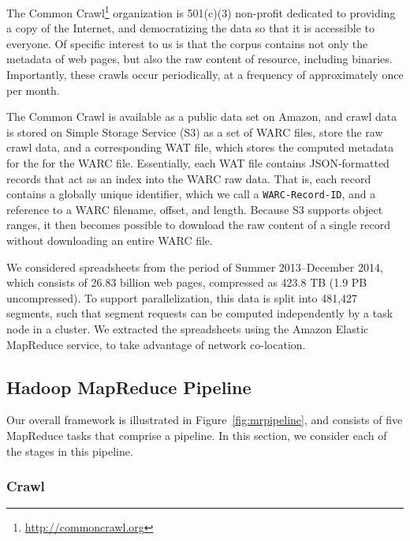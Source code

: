 \documentclass[conference]{IEEEtran}
\begin{document}

The Common Crawl\footnote{\url{http://commoncrawl.org}} organization is 501(c)(3) non-profit dedicated to providing a copy of the Internet, and democratizing the data so that it is accessible to everyone. 
%
Of specific interest to us is that the corpus contains not only the metadata of web pages, but also the raw content of resource, including binaries. Importantly, these crawls occur periodically, at a frequency of approximately once per month. 

The Common Crawl is available as a public data set on Amazon, and crawl data is stored on Simple Storage Service (S3) as a set of WARC files, store the raw crawl data, and a corresponding WAT file, which stores the computed metadata for the for the WARC file. Essentially, each WAT file contains JSON-formatted records that act as an index into the WARC raw data. That is, each record contains a globally unique identifier, which we call a \texttt{WARC-Record-ID}, and a reference to a WARC filename, offset, and length. Because S3 supports object ranges, it then becomes possible to download the raw content of a single record without downloading an entire WARC file.

We considered spreadsheets from the period of Summer 2013--December 2014, which consists of 26.83 billion web pages, compressed as 423.8 TB (1.9 PB uncompressed). To support parallelization, this data is split into 481,427 segments, such that segment requests can be computed independently by a task node in a cluster. We extracted the spreadsheets using the Amazon Elastic MapReduce service, to take advantage of network co-location.

 

\subsection{Hadoop MapReduce Pipeline}


Our overall framework is illustrated in Figure~\ref{fig:mrpipeline}, and consists of five MapReduce tasks that comprise a pipeline. In this section, we consider each of the stages in this pipeline.

\subsubsection{Crawl} 
\end{document}

